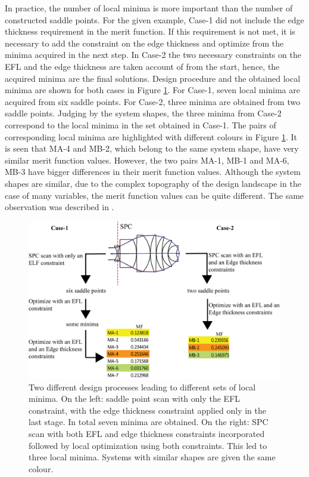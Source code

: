 In practice, the number of local minima is more important than the number of constructed saddle points. For the given example, Case-1 did not include the edge thickness requirement in the merit function. If this requirement is not met, it is necessary to add the constraint on the edge thickness and optimize from the minima acquired in the next step. In Case-2 the two necessary constraints on the EFL and the edge thickness are taken account of from the start, hence, the acquired minima are the final solutions. Design procedure and the obtained local minima are shown for both cases in Figure \ref{fig: vollrath_constr_flow}. For Case-1, seven local minima are acquired from six saddle points. For Case-2, three minima are obtained from two saddle points. Judging by the system shapes, the three minima from Case-2 correspond to the local minima in the set obtained in Case-1. The pairs of corresponding local minima are highlighted with different colours in Figure \ref{fig: vollrath_constr_flow}. It is seen that MA-4 and MB-2, which belong to the same system shape, have very similar merit function values. However, the two pairs MA-1, MB-1 and MA-6, MB-3 have bigger differences in their merit function values. Although the system shapes are similar, due to the complex topography of the design landscape in the case of many variables, the merit function values can be quite different. The same observation was described in \cite{PascalTriplet2009}. 


\begin{figure}[h!]
    \centering
    \includegraphics[width=\textwidth]{chapter-4/figures/Vollrath_ConstraintDif_flow.png}
    \caption{Two different design processes leading to different sets of local minima. On the left: saddle point scan with only the EFL constraint, with the edge thickness constraint applied only in the last stage. In total seven minima are obtained. On the right: SPC scan with both EFL and edge thickness constraints incorporated followed by local optimization using both constraints. This led to three local minima. Systems with similar shapes are given the same colour.}
    \label{fig: vollrath_constr_flow}
\end{figure}

